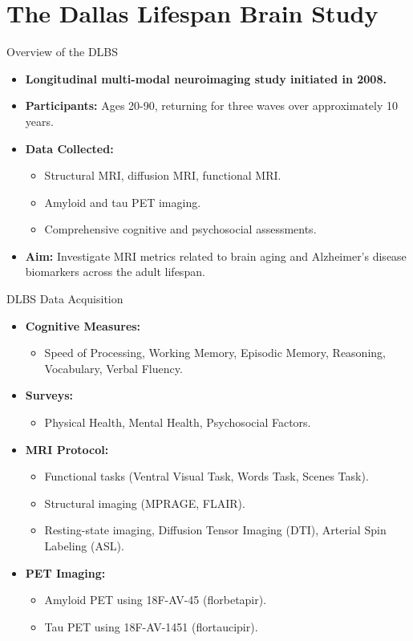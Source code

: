 \documentclass{beamer}
\begin{document}
\section{The Dallas Lifespan Brain Study}
\begin{frame}{Overview of the DLBS\cite{ds004856:1.0.0}}
  \begin{itemize}
    \item \textbf{Longitudinal multi-modal neuroimaging study initiated in 2008.}
    \item \textbf{Participants:} Ages 20-90, returning for three waves over approximately 10 years.
    \item \textbf{Data Collected:}
      \begin{itemize}
        \item Structural MRI, diffusion MRI, functional MRI.
        \item Amyloid and tau PET imaging.
        \item Comprehensive cognitive and psychosocial assessments.
      \end{itemize}
    \item \textbf{Aim:} Investigate MRI metrics related to brain aging and Alzheimer's disease biomarkers across the adult lifespan.
  \end{itemize}
\end{frame}

\begin{frame}{DLBS Data Acquisition}
  \begin{itemize}
    \item \textbf{Cognitive Measures:}
      \begin{itemize}
        \item Speed of Processing, Working Memory, Episodic Memory, Reasoning, Vocabulary, Verbal Fluency.
      \end{itemize}
    \item \textbf{Surveys:}
      \begin{itemize}
        \item Physical Health, Mental Health, Psychosocial Factors.
      \end{itemize}
    \item \textbf{MRI Protocol:}
      \begin{itemize}
        \item Functional tasks (Ventral Visual Task, Words Task, Scenes Task).
        \item Structural imaging (MPRAGE, FLAIR).
        \item Resting-state imaging, Diffusion Tensor Imaging (DTI), Arterial Spin Labeling (ASL).
      \end{itemize}
    \item \textbf{PET Imaging:}
      \begin{itemize}
        \item Amyloid PET using 18F-AV-45 (florbetapir).
        \item Tau PET using 18F-AV-1451 (flortaucipir).
      \end{itemize}
  \end{itemize}
\end{frame}
\end{document}
